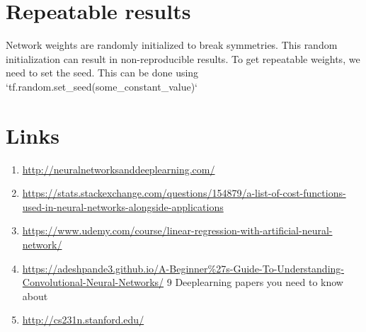 \documentclass{article}
\begin{document}
\section{Repeatable results}
Network weights are randomly initialized to break symmetries. This random initialization can result in non-reproducible results. To get repeatable weights, we need to set the seed. This can be done using `tf.random.set\_seed(some\_constant\_value)`
\section{Links}
\begin{enumerate}
\item{\url{http://neuralnetworksanddeeplearning.com/}}
\item{\url{https://stats.stackexchange.com/questions/154879/a-list-of-cost-functions-used-in-neural-networks-alongside-applications}}
\item{\url{https://www.udemy.com/course/linear-regression-with-artificial-neural-network/}}
\item{\url{https://adeshpande3.github.io/A-Beginner%27s-Guide-To-Understanding-Convolutional-Neural-Networks/} 9 Deeplearning  papers you need to know about}
\item{\url{http://cs231n.stanford.edu/} }    
\end{enumerate}
\end{document}
